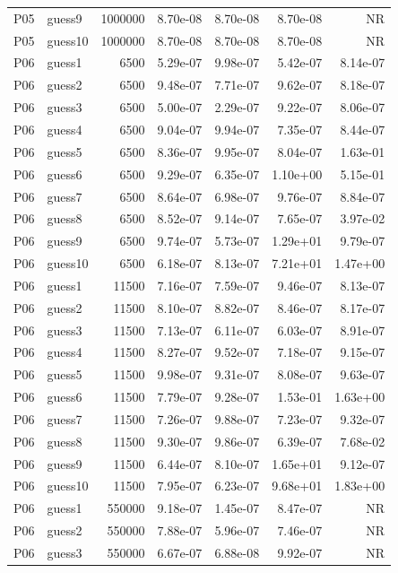 {\begin{longtable}{llrrrrr}
P05 & guess9 & 1000000 & 8.70e-08 & 8.70e-08 & 8.70e-08 & NR \\
P05 & guess10 & 1000000 & 8.70e-08 & 8.70e-08 & 8.70e-08 & NR \\
P06 & guess1 & 6500 & 5.29e-07 & 9.98e-07 & 5.42e-07 & 8.14e-07 \\
P06 & guess2 & 6500 & 9.48e-07 & 7.71e-07 & 9.62e-07 & 8.18e-07 \\
P06 & guess3 & 6500 & 5.00e-07 & 2.29e-07 & 9.22e-07 & 8.06e-07 \\
P06 & guess4 & 6500 & 9.04e-07 & 9.94e-07 & 7.35e-07 & 8.44e-07 \\
P06 & guess5 & 6500 & 8.36e-07 & 9.95e-07 & 8.04e-07 & 1.63e-01 \\
P06 & guess6 & 6500 & 9.29e-07 & 6.35e-07 & 1.10e+00 & 5.15e-01 \\
P06 & guess7 & 6500 & 8.64e-07 & 6.98e-07 & 9.76e-07 & 8.84e-07 \\
P06 & guess8 & 6500 & 8.52e-07 & 9.14e-07 & 7.65e-07 & 3.97e-02 \\
P06 & guess9 & 6500 & 9.74e-07 & 5.73e-07 & 1.29e+01 & 9.79e-07 \\
P06 & guess10 & 6500 & 6.18e-07 & 8.13e-07 & 7.21e+01 & 1.47e+00 \\
P06 & guess1 & 11500 & 7.16e-07 & 7.59e-07 & 9.46e-07 & 8.13e-07 \\
P06 & guess2 & 11500 & 8.10e-07 & 8.82e-07 & 8.46e-07 & 8.17e-07 \\
P06 & guess3 & 11500 & 7.13e-07 & 6.11e-07 & 6.03e-07 & 8.91e-07 \\
P06 & guess4 & 11500 & 8.27e-07 & 9.52e-07 & 7.18e-07 & 9.15e-07 \\
P06 & guess5 & 11500 & 9.98e-07 & 9.31e-07 & 8.08e-07 & 9.63e-07 \\
P06 & guess6 & 11500 & 7.79e-07 & 9.28e-07 & 1.53e-01 & 1.63e+00 \\
P06 & guess7 & 11500 & 7.26e-07 & 9.88e-07 & 7.23e-07 & 9.32e-07 \\
P06 & guess8 & 11500 & 9.30e-07 & 9.86e-07 & 6.39e-07 & 7.68e-02 \\
P06 & guess9 & 11500 & 6.44e-07 & 8.10e-07 & 1.65e+01 & 9.12e-07 \\
P06 & guess10 & 11500 & 7.95e-07 & 6.23e-07 & 9.68e+01 & 1.83e+00 \\
P06 & guess1 & 550000 & 9.18e-07 & 1.45e-07 & 8.47e-07 & NR \\
P06 & guess2 & 550000 & 7.88e-07 & 5.96e-07 & 7.46e-07 & NR \\
P06 & guess3 & 550000 & 6.67e-07 & 6.88e-08 & 9.92e-07 & NR \\

\end{longtable}}
